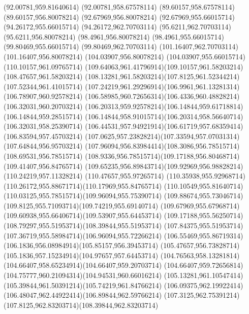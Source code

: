 {{	\lineto(92.00781,959.81640614)
	\lineto(92.00781,958.67578114)
	\lineto(89.60157,958.67578114)
	\lineto(89.60157,956.80078214)
	\lineto(92.67969,956.80078214)
	\lineto(92.67969,955.66015714)
	\closepath
	\moveto(94.26172,955.66015714)
	\lineto(94.26172,962.70703114)
	\lineto(95.6211,962.70703114)
	\lineto(95.6211,956.80078214)
	\lineto(98.4961,956.80078214)
	\lineto(98.4961,955.66015714)
	\closepath
	\moveto(99.80469,955.66015714)
	\lineto(99.80469,962.70703114)
	\lineto(101.16407,962.70703114)
	\lineto(101.16407,956.80078214)
	\lineto(104.03907,956.80078214)
	\lineto(104.03907,955.66015714)
	\closepath
	\moveto(110.10157,961.09765714)
	\curveto(109.64063,961.41796914)(109.10157,961.58203214)(108.47657,961.58203214)
	\curveto(108.13281,961.58203214)(107.8125,961.52344214)(107.52344,961.41015714)
	\curveto(107.24219,961.29296914)(106.9961,961.13281314)(106.78907,960.92578214)
	\curveto(106.58985,960.72656314)(106.4336,960.48828214)(106.32031,960.20703214)
	\curveto(106.20313,959.92578214)(106.14844,959.61718814)(106.14844,959.28515714)
	\curveto(106.14844,958.91015714)(106.20314,958.56640714)(106.32031,958.25390714)
	\curveto(106.44531,957.94921914)(106.61719,957.68359414)(106.83594,957.45703214)
	\curveto(107.0625,957.23828214)(107.33594,957.07031314)(107.64844,956.95703214)
	\curveto(107.96094,956.83984414)(108.3086,956.78515714)(108.69531,956.78515714)
	\curveto(108.9336,956.78515714)(109.17188,956.80468714)(109.41407,956.84765714)
	\curveto(109.65235,956.89843714)(109.92969,956.98828214)(110.24219,957.11328214)
	\lineto(110.47657,955.97265714)
	\curveto(110.35938,955.92968714)(110.26172,955.88671714)(110.17969,955.84765714)
	\curveto(110.10549,955.81640714)(110.03125,955.78515714)(109.96094,955.75390714)
	\curveto(109.88674,955.73046714)(109.8125,955.71093714)(109.74219,955.69140714)
	\curveto(109.67969,955.67968714)(109.60938,955.66406714)(109.53907,955.64453714)
	\curveto(109.17188,955.56250714)(108.79297,955.51953714)(108.39844,955.51953714)
	\curveto(107.84375,955.51953714)(107.36719,955.58984714)(106.96094,955.72266214)
	\curveto(106.55469,955.86719314)(106.1836,956.08984914)(105.85157,956.39453714)
	\curveto(105.47657,956.73828714)(105.1836,957.15234914)(104.97657,957.64453714)
	\curveto(104.76563,958.13281814)(104.66407,958.65234914)(104.66407,959.20703714)
	\curveto(104.66407,959.72656814)(104.75777,960.21094314)(104.94531,960.66016214)
	\curveto(105.13281,961.10547414)(105.39844,961.50391214)(105.74219,961.84766214)
	\curveto(106.09375,962.19922414)(106.48047,962.44922414)(106.89844,962.59766214)
	\curveto(107.3125,962.75391214)(107.8125,962.83203714)(108.39844,962.83203714)
}}

